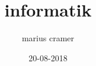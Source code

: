 \documentclass{article}
\title{informatik}
\author{marius cramer}
\date{20-08-2018}
\begin{document}
\maketitle

\tableofcontents

\newpage

\section{}
\end{document}
